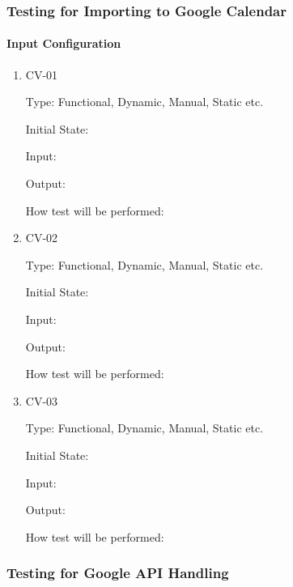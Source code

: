 \documentclass[12pt, titlepage]{article}
\begin{document}
\subsubsection{Testing for Importing to Google Calendar}

\paragraph{Input Configuration}

\begin{enumerate}

\item{CV-01\\}

Type: Functional, Dynamic, Manual, Static etc.
					
Initial State: 
					
Input: 
					
Output: 
					
How test will be performed: 

\item{CV-02\\}

Type: Functional, Dynamic, Manual, Static etc.
					
Initial State: 
					
Input: 
					
Output: 
					
How test will be performed: 

\item{CV-03\\}

Type: Functional, Dynamic, Manual, Static etc.
					
Initial State: 
					
Input: 
					
Output: 
					
How test will be performed: 
\end{enumerate}


\subsubsection{Testing for Google API Handling}
\end{document}
